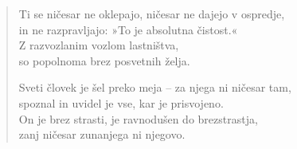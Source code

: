 \begin{verse}
Ti se ničesar ne oklepajo, ničesar ne dajejo v ospredje,\\
in ne razpravljajo: »To je absolutna čistost.«\\
Z razvozlanim vozlom lastništva,\\
so popolnoma brez posvetnih želja.

Sveti človek je šel preko meja -- za njega ni ničesar tam,\\
spoznal in uvidel je vse, kar je prisvojeno.\\
On je brez strasti, je ravnodušen do brezstrastja,\\
zanj ničesar zunanjega ni njegovo.

\end{verse}


\clearpage
\begin{verse}


\end{verse}


\clearpage
\begin{verse}


\end{verse}

